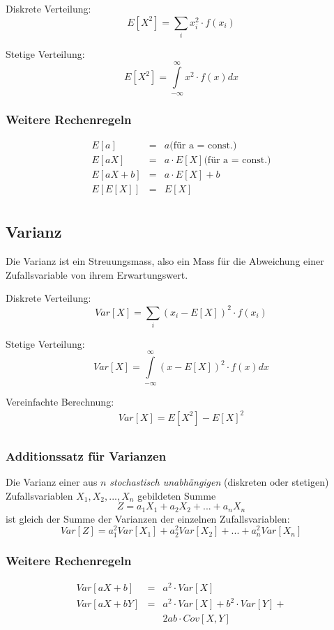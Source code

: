 \documentclass[10pt,a4paper,twocolumn]{article}
\begin{document}
\vspace{10pt}

Diskrete Verteilung:
\[
E[X^2]=\sum\limits_{i} x_i^2\cdot f(x_i)
\]

Stetige Verteilung:
\[
E[X^2]=\int\limits_{-\infty}^{\infty}x^2\cdot f(x)dx
\]

\subsubsection{Weitere Rechenregeln}
\[
\begin{array}{rcl}
	E[a] & = & a \text{(für a = const.)} \\
	E[aX] & = & a \cdot E[X] \text{(für a = const.)} \\
	E[aX + b] & = & a \cdot E[X] + b \\	
	E[E[X]] & = & E[X] \\
\end{array}
\]

\subsection{Varianz}
Die Varianz ist ein Streuungsmass, also ein Mass für die Abweichung einer Zufallsvariable von ihrem Erwartungswert.

\vspace{10pt}

Diskrete Verteilung:
\[
Var[X]=\sum\limits_{i}(x_i-E[X])^2\cdot f(x_i)
\]

Stetige Verteilung:
\[
Var[X]=\int\limits_{-\infty}^{\infty}(x-E[X])^2\cdot f(x)dx
\]

Vereinfachte Berechnung:
\[
\begin{array}{c}
	Var[X] = E[X^2] - E[X]^2 \\
\end{array}
\]

\subsubsection{Additionssatz für Varianzen}
Die Varianz einer aus $n$ \emph{stochastisch unabhängigen} (diskreten oder stetigen) Zufallsvariablen $X_1,X_2,...,X_n$ gebildeten Summe
\[
Z=a_1X_1+a_2X_2+...+a_nX_n
\]
ist gleich der Summe der Varianzen der einzelnen Zufallsvariablen:
\[
Var[Z]=a_1^2Var[X_1]+a_2^2Var[X_2]+...+a_n^2Var[X_n]
\]

\subsubsection{Weitere Rechenregeln}
\[
\begin{array}{rcl}
	Var[aX + b] & = & a^2 \cdot Var[X] \\
	Var[aX + bY] & = & a^2 \cdot Var[X] + b^2 \cdot Var[Y] + \\
	& &  2ab \cdot Cov[X,Y] \\
\end{array}	
\]
\end{document}
